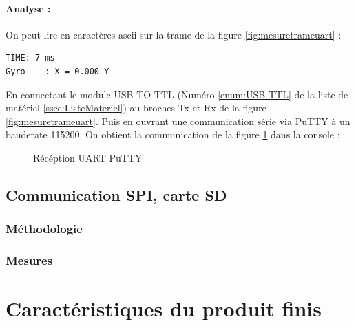 {	\paragraph{Analyse :} On peut lire en caractères ascii sur la trame de la figure \ref{fig:mesuretrameuart} : 
	\begin{lstlisting}[frame=single, caption={Trame UART en ASCII}, captionpos=b, breaklines=true]
TIME: 7 ms 
Gyro    : X = 0.000	Y 
	\end{lstlisting} 

	En connectant le module USB-TO-TTL (Numéro \ref{enum:USB-TTL} de la liste de matériel \ref{ssec:ListeMateriel}) au broches Tx et Rx de la figure \ref{fig:mesuretrameuart}. Puis en ouvrant une communication série via PuTTY à un bauderate 115200. On obtient la communication de la figure \ref{} dans la console :
	
	\begin{figure}[h]
		\centering
		\caption{Récéption UART PuTTY}
		\label{fig:puttysercomm}
	\end{figure}
	
	

}

\subsection{Communication SPI, carte SD}
{
	\subsubsection{Méthodologie}
	
	\subsubsection{Mesures}

}

\section{Caractéristiques du produit finis}

